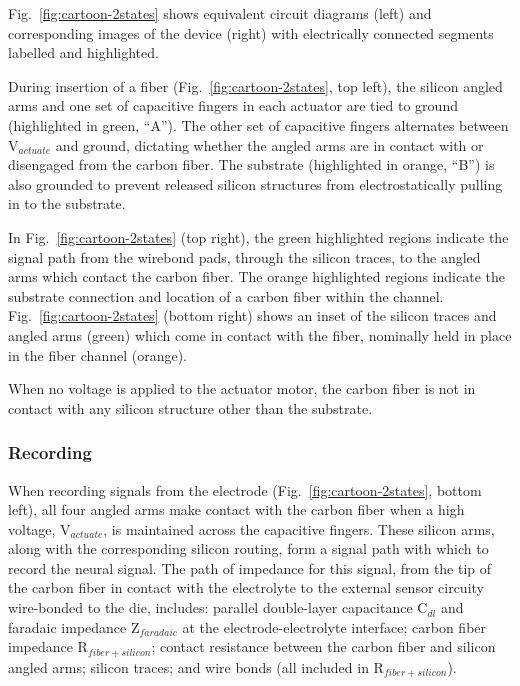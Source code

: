     
    Fig.~\ref{fig:cartoon-2states} shows equivalent circuit diagrams (left) and corresponding images of the device (right) with electrically connected segments labelled and highlighted.
    
    During insertion of a fiber (Fig.~\ref{fig:cartoon-2states}, top left), the silicon angled arms and one set of capacitive fingers in each actuator are tied to ground (highlighted in green, ``A''). The other set of capacitive fingers alternates between V$_{actuate}$ and ground, dictating whether the angled arms are in contact with or disengaged from the carbon fiber. The substrate (highlighted in orange, ``B'') is also grounded to prevent released silicon structures from electrostatically pulling in to the substrate.
    
    In Fig.~\ref{fig:cartoon-2states} (top right), the green highlighted regions indicate the signal path from the wirebond pads, through the silicon traces, to the angled arms which contact the carbon fiber. The orange highlighted regions indicate the substrate connection and location of a carbon fiber within the channel. Fig.~\ref{fig:cartoon-2states} (bottom right) shows an inset of the silicon traces and angled arms (green) which come in contact with the fiber, nominally held in place in the fiber channel (orange).

    When no voltage is applied to the actuator motor, the carbon fiber is not in contact with any silicon structure other than the substrate.
    
    \subsubsection{Recording}
    When recording signals from the electrode (Fig.~\ref{fig:cartoon-2states}, bottom left), all four angled arms make contact with the carbon fiber when a high voltage, V$_{actuate}$, is maintained across the capacitive fingers. These silicon arms, along with the corresponding silicon routing, form a signal path with which to record the neural signal. The path of impedance for this signal, from the tip of the carbon fiber in contact with the electrolyte to the external sensor circuity wire-bonded to the die, includes: parallel double-layer capacitance C$_{dl}$ and faradaic impedance Z$_{faradaic}$ at the electrode-electrolyte interface; carbon fiber impedance R$_{fiber+silicon}$; contact resistance between the carbon fiber and silicon angled arms; silicon traces; and wire bonds (all included in R$_{fiber+silicon}$). 
    
